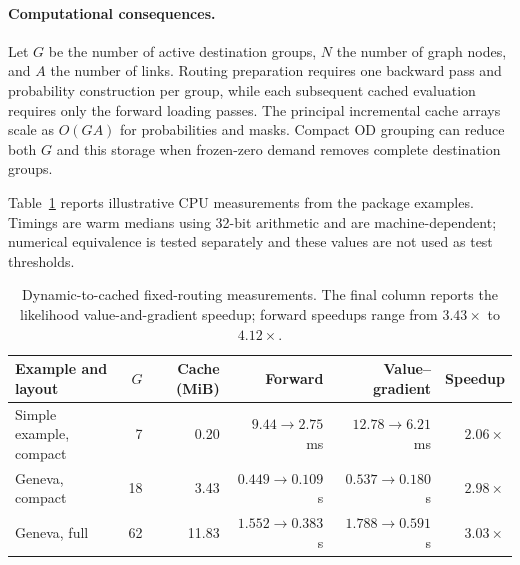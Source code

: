 \paragraph{Computational consequences.}
Let $G$ be the number of active destination groups, $N$ the number of graph
nodes, and $A$ the number of links. Routing preparation requires one backward
pass and probability construction per group, while each subsequent cached
evaluation requires only the forward loading passes. The principal incremental
cache arrays scale as $O(GA)$ for probabilities and masks. Compact OD grouping
can reduce both $G$ and this storage when frozen-zero demand removes complete
destination groups.

Table~\ref{tab:fixed-routing-benchmarks} reports illustrative CPU measurements
from the package examples. Timings are warm medians using 32-bit arithmetic and
are machine-dependent; numerical equivalence is tested separately and these
values are not used as test thresholds.

\begin{table}[htbp]
\centering
\begin{tabular}{lrrrrr}
\hline
Example and layout & $G$ & Cache (MiB) & Forward & Value--gradient & Speedup \\
\hline
Simple example, compact & 7 & 0.20 & $9.44\!\to\!2.75$ ms & $12.78\!\to\!6.21$ ms & $2.06\times$ \\
Geneva, compact & 18 & 3.43 & $0.449\!\to\!0.109$ s & $0.537\!\to\!0.180$ s & $2.98\times$ \\
Geneva, full & 62 & 11.83 & $1.552\!\to\!0.383$ s & $1.788\!\to\!0.591$ s & $3.03\times$ \\
\hline
\end{tabular}
\caption{Dynamic-to-cached fixed-routing measurements. The final column reports
the likelihood value-and-gradient speedup; forward speedups range from
$3.43\times$ to $4.12\times$.}
\label{tab:fixed-routing-benchmarks}
\end{table}

